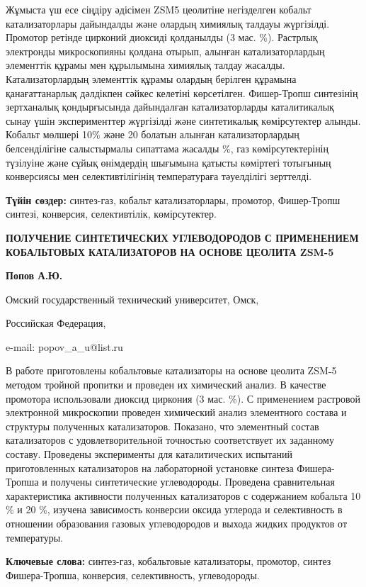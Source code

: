 Жұмыста үш есе сіңдіру әдісімен ZSM5 цеолитіне негізделген кобальт
катализаторлары дайындалды және олардың химиялық талдауы жүргізілді.
Промотор ретінде цирконий диоксиді қолданылды (3 мас. \%). Растрлық
электронды микроскопияны қолдана отырып, алынған катализаторлардың
элементтік құрамы мен құрылымына химиялық талдау жасалды.
Катализаторлардың элементтік құрамы олардың берілген құрамына
қанағаттанарлық дәлдікпен сәйкес келетіні көрсетілген. Фишер-Тропш
синтезінің зертханалық қондырғысында дайындалған катализаторларды
каталитикалық сынау үшін эксперименттер жүргізілді және синтетикалық
көмірсутектер алынды. Кобальт мөлшері 10\% және 20 болатын алынған
катализаторлардың белсенділігіне салыстырмалы сипаттама жасалды \%, газ
көмірсутектерінің түзілуіне және сұйық өнімдердің шығымына қатысты
көміртегі тотығының конверсиясы мен селективтілігінің температураға
тәуелділігі зерттелді.

\textbf{Түйін сөздер:} синтез-газ, кобальт катализаторлары, промотор,
Фишер-Тропш синтезі, конверсия, селективтілік, көмірсутектер.

\textbf{ПОЛУЧЕНИЕ СИНТЕТИЧЕСКИХ УГЛЕВОДОРОДОВ С ПРИМЕНЕНИЕМ КОБАЛЬТОВЫХ
КАТАЛИЗАТОРОВ НА ОСНОВЕ ЦЕОЛИТА ZSM-5}

\textbf{Попов А.Ю.}

Омский государственный технический университет, Омск,

Российская Федерация,

e-mail: popov\_a\_u@list.ru

В работе приготовлены кобальтовые катализаторы на основе цеолита ZSM˗5
методом тройной пропитки и проведен их химический анализ. В качестве
промотора использовали диоксид циркония (3 мас. \%). С применением
растровой электронной микроскопии проведен химический анализ элементного
состава и структуры полученных катализаторов. Показано, что элементный
состав катализаторов с удовлетворительной точностью соответствует их
заданному составу. Проведены эксперименты для каталитических испытаний
приготовленных катализаторов на лабораторной установке синтеза
Фишера-Тропша и получены синтетические углеводороды. Проведена
сравнительная характеристика активности полученных катализаторов с
содержанием кобальта 10 \% и 20 \%, изучена зависимость конверсии оксида
углерода и селективность в отношении образования газовых углеводородов и
выхода жидких продуктов от температуры.

\textbf{Ключевые слова:} синтез-газ, кобальтовые катализаторы, промотор,
синтез Фишера-Тропша, конверсия, селективность, углеводороды.

